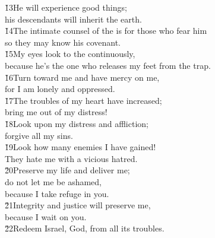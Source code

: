 \begin{poetry}
\poeml \v{13}He will experience good things; \\
\poemll    his descendants will inherit the earth. \\
\poeml \v{14}The intimate counsel of the  is for those who fear him \\
\poemll    so they may know his covenant. \\
\poeml \v{15}My eyes look to the  continuously, \\
\poemll    because he's the one who releases my feet from the trap. \\
\poeml \v{16}Turn toward me and have mercy on me, \\
\poemll    for I am lonely and oppressed. \\
\poeml \v{17}The troubles of my heart have increased; \\
\poemll    bring me out of my distress! \\
\poeml \v{18}Look upon my distress and affliction; \\
\poemll    forgive all my sins. \\
\poeml \v{19}Look how many enemies I have gained! \\
\poemll    They hate me with a vicious hatred. \\
\poeml \v{20}Preserve my life and deliver me; \\
\poemll    do not let me be ashamed, \\
\poemlll       because I take refuge in you. \\
\poeml \v{21}Integrity and justice will preserve me, \\
\poemll    because I wait on you. \\
\poeml \v{22}Redeem Israel, God, from all its troubles.
\end{poetry}

